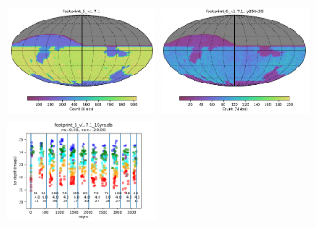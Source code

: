 \documentclass[modern]{aastex62}
\begin{document}
\begin{figure}
\includegraphics[height=1.25in, width=1.75in]{plots/footprint_6_v1.7.1/footprint_6_v1_7_1_Count_HEAL_SkyMap.pdf}
\includegraphics[height=1.25in, width=1.75in]{plots/footprint_6_v1.7.1/footprint_6_v1_7_1_Count_night_gt_913_125000_and_night_lt_1278_375000_and_note_not_like_DD_HEAL_SkyMap.pdf}
\includegraphics[height=1.25in, width=1.75in]{plots/footprint_6_v171_spotc.pdf} \\


\end{figure}
\end{document}
